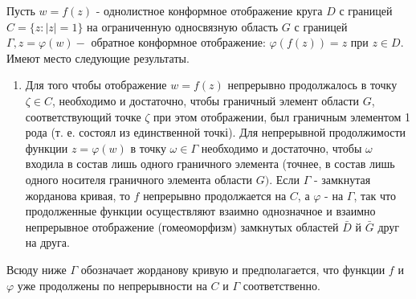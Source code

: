 \documentclass[10pt]{article}
\begin{document}
Пусть $w=f(z)$ - однолистное конформное отображение круга $D$ с границей $C=\{z:|z|=1\}$ на ограниченную односвязную область $G$ с границей $\Gamma, z=\varphi(w)-$ обратное конформное отображение: $\varphi(f(z))=z$ при $z \in D$. Имеют место следующие результаты.



\begin{enumerate}

  \item Для того чтобы отображение $w=f(z)$ непрерывно продолжалось в точку $\zeta \in C$, необходимо и достаточно, чтобы граничный элемент области $G$, соответствующий точке $\zeta$ при этом отображении, был граничным элементом 1 рода (т. е. состоял из единственной точкі). Для непрерывной продолжимости функции $z=\varphi(w)$ в точку $\omega \in \Gamma$ необходимо и достаточно, чтобы $\omega$ входила в состав лишь одного граничного элемента (точнее, в состав лишь одного носителя граничного элемента области $G)$. Если $\Gamma$ - замкнутая жорданова кривая, то $f$ непрерывно продолжается на $C$, а $\varphi$ - на $\Gamma$, так что продолженные функции осуществляют взаимно однозначное и взаимно непрерывное отображение (гомеоморфизм) замкнутых областей $\bar{D}$ й $\bar{G}$ друг на друга.

\end{enumerate}



Всюду ниже $\Gamma$ обозначает жорданову кривую и предполагается, что функции $f$ и $\varphi$ уже продолжены по непрерывности на $C$ и $\Gamma$ соответственно.
\end{document}
